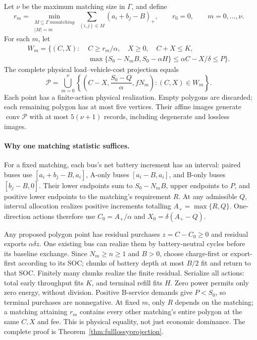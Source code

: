 \begin{theorem}\label{thm:coreprojection}
Let $\nu$ be the maximum matching size in $\Gamma$, and define
\[
 r_m=\min_{\substack{M\subseteq\Gamma\ {
m matching}\\|M|=m}}
       \sum_{(i,j)\in M}(a_i+b_j-B)_+,
 \qquad r_0=0,\qquad m=0,\ldots,\nu.
\]
For each $m$, let
\[
\begin{split}
 W_m=\bigl\{(C,X):\;&C\ge r_m/\alpha,\quad X\ge0,\quad C+X\le K,\\
 &\max\{S_0-N_mB,S_0-\alpha H\}
       \le\alpha C-X/\delta\le P\bigr\}.
\end{split}
\]
The complete physical load--vehicle-cost projection equals
\[
 \mathcal P=\bigcup_{m=0}^{\nu}
 \left\{\left(C-X,\frac{S_0-Q}{\alpha},fN_m\right):
          (C,X)\in W_m\right\}.
\]
Each point has a finite-action physical realization. Empty polygons are
discarded; each remaining polygon has at most five vertices. Their affine
images generate $\operatorname{conv}\mathcal P$ with at most
$5(\nu+1)$ records, including degenerate and lossless images.
\end{theorem}

\paragraph{Why one matching statistic suffices.}
For a fixed matching, each bus's net battery increment has an interval:
paired buses use $[a_i+b_j-B,a_i]$, A-only buses $[a_i-B,a_i]$, and
B-only buses $[b_j-B,0]$. Their lower endpoints sum to $S_0-N_mB$,
upper endpoints to $P$, and positive lower endpoints to the matching's
requirement $R$. At any admissible $Q$, interval allocation realizes
positive increments totalling $A_+=\max\{R,Q\}$. One-direction actions
therefore use $C_0=A_+/\alpha$ and $X_0=\delta(A_+-Q)$.

Any proposed polygon point has residual purchases $z=C-C_0\ge0$ and
residual exports $\alpha\delta z$. One existing bus can realize them
by battery-neutral cycles before its baseline exchange. Since
$N_m\ge n\ge1$ and $B>0$, choose charge-first or export-first according
to its SOC; chunks of battery depth at most $B/2$ fit and return to that
SOC. Finitely many chunks realize the finite residual. Serialize all
actions: total early throughput fits $K$, and terminal refill fits $H$.
Zero power permits only zero energy, without division. Positive B-service
demands give $P<S_0$, so terminal purchases are nonnegative. At fixed
$m$, only $R$ depends on the matching; a matching attaining $r_m$
contains every other matching's entire polygon at the same $C,X$ and fee.
This is physical equality, not just economic dominance. The complete proof
is Theorem~\ref{thm:fulllossyprojection}.

